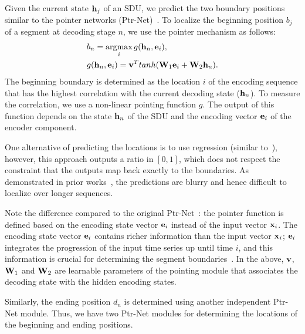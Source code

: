 \documentclass[10pt,journal,compsoc]{IEEEtran}
\begin{document}
 Given the current state ${\bf h}_j$ of an SDU, we  predict the two boundary positions similar to the pointer networks (Ptr-Net)~\cite{vinyals2015pointer}. To localize the beginning position $b_j$ of a segment at decoding stage $n$, we use the pointer mechanism as follows:
\begin{align}
&b_n =  \myargmax{i} g(\h_n, \e_i),\label{eqn:eq1} \\
&g(\h_n, \e_i)  = \mathbf{v}^T \mbox{tanh}(\W_1 \e_i +  \W_2 \h_n ). \label{eqn:eq2}
\end{align}
The beginning boundary is determined as the location $i$ of the encoding sequence that has the highest correlation with the current decoding state (${\bf h}_n$). To measure the correlation, we use a non-linear pointing function $g$. The output of this function depends on the state ${\bf h}_n$ of the SDU and the encoding vector ${\bf e}_i$ of the encoder component.

One alternative of predicting the locations is to use regression (similar to~\cite{liu2016ssd,redmon2016you}), however, this approach outputs a ratio in $[0, 1]$, which does not respect the constraint that the outputs map back exactly to the boundaries. As demonstrated in prior works~\cite{srivastava2015unsupervised,vinyals2015pointer}, the predictions are blurry and hence difficult to localize over longer sequences.   

Note the difference compared to the original Ptr-Net~\cite{vinyals2015pointer}: the pointer function is defined based on the encoding state vector ${\bf e}_i$ instead of the input vector ${\bf x}_i$. The encoding state vector ${\bf e}_i$ contains richer information than the input vector ${\bf x}_i$; ${\bf e}_i$ integrates the progression of the input time series up until time $i$, and this information is crucial for determining the segment boundaries~\cite{ma2016learning}. In the above, $\bf{v}$, ${\bf W}_1$ and ${\bf W}_2$ are learnable parameters of the pointing module that associates the decoding state with the hidden encoding states. 

Similarly, the ending position $d_n$ is determined using another independent Ptr-Net module. Thus, we have two Ptr-Net modules for determining the locations of the beginning and ending positions.

\end{document}
